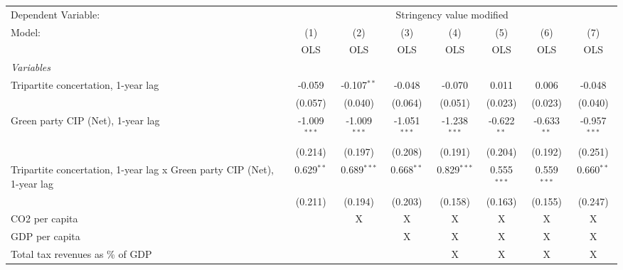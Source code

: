 
\begingroup
\centering
\begin{tabular}{lccccccc}
   \toprule
   Dependent Variable: & \multicolumn{7}{c}{Stringency value modified}\\
   Model:                                                                  & (1)            & (2)            & (3)            & (4)            & (5)           & (6)           & (7)\\  
                                                                           &  OLS           & OLS            & OLS            & OLS            & OLS           & OLS           & OLS\\  
   \midrule
   \emph{Variables}\\
   Tripartite concertation, 1-year lag                                     & -0.059         & -0.107$^{**}$  & -0.048         & -0.070         & 0.011         & 0.006         & -0.048\\   
                                                                           & (0.057)        & (0.040)        & (0.064)        & (0.051)        & (0.023)       & (0.023)       & (0.040)\\   
   Green party CIP (Net), 1-year lag                                       & -1.009$^{***}$ & -1.009$^{***}$ & -1.051$^{***}$ & -1.238$^{***}$ & -0.622$^{**}$ & -0.633$^{**}$ & -0.957$^{***}$\\   
                                                                           & (0.214)        & (0.197)        & (0.208)        & (0.191)        & (0.204)       & (0.192)       & (0.251)\\   
   Tripartite concertation, 1-year lag x Green party CIP (Net), 1-year lag & 0.629$^{**}$   & 0.689$^{***}$  & 0.668$^{**}$   & 0.829$^{***}$  & 0.555$^{***}$ & 0.559$^{***}$ & 0.660$^{**}$\\   
                                                                           & (0.211)        & (0.194)        & (0.203)        & (0.158)        & (0.163)       & (0.155)       & (0.247)\\   
   CO2 per capita                                                          &                & X              & X              & X              & X             & X             & X\\  
   GDP per capita                                                          &                &                & X              & X              & X             & X             & X\\  
   Total tax revenues as \% of GDP                                         &                &                &                & X              & X             & X             & X\\  

\end{tabular}
